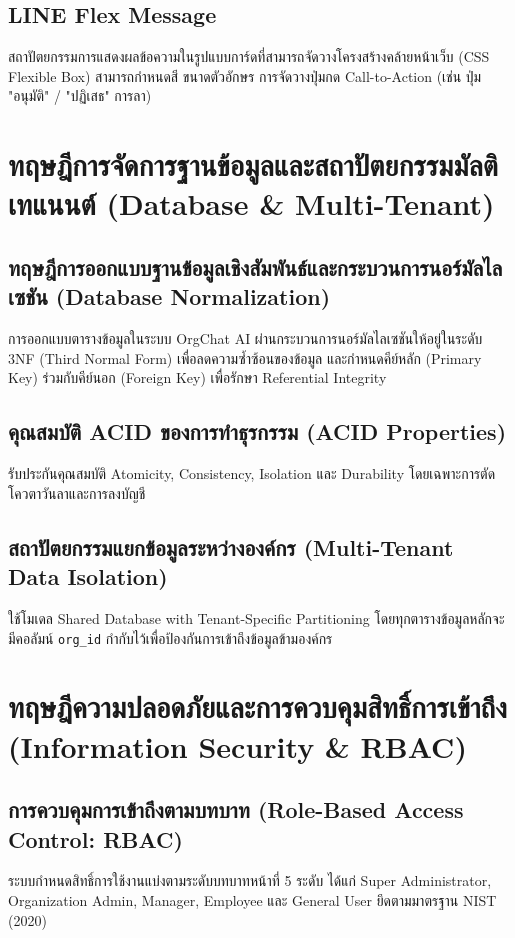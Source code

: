 \subsection{LINE Flex Message}
\hspace*{1.3em}
สถาปัตยกรรมการแสดงผลข้อความในรูปแบบการ์ดที่สามารถจัดวางโครงสร้างคล้ายหน้าเว็บ (CSS Flexible Box) สามารถกำหนดสี ขนาดตัวอักษร การจัดวางปุ่มกด Call-to-Action (เช่น ปุ่ม "อนุมัติ" / "ปฏิเสธ" การลา)

\section{ทฤษฎีการจัดการฐานข้อมูลและสถาปัตยกรรมมัลติเทแนนต์ (Database \& Multi-Tenant)}

\subsection{ทฤษฎีการออกแบบฐานข้อมูลเชิงสัมพันธ์และกระบวนการนอร์มัลไลเซชัน (Database Normalization)}
\hspace*{1.3em}
การออกแบบตารางข้อมูลในระบบ OrgChat AI ผ่านกระบวนการนอร์มัลไลเซชันให้อยู่ในระดับ 3NF (Third Normal Form) เพื่อลดความซ้ำซ้อนของข้อมูล และกำหนดคีย์หลัก (Primary Key) ร่วมกับคีย์นอก (Foreign Key) เพื่อรักษา Referential Integrity

\subsection{คุณสมบัติ ACID ของการทำธุรกรรม (ACID Properties)}
\hspace*{1.3em}
รับประกันคุณสมบัติ Atomicity, Consistency, Isolation และ Durability โดยเฉพาะการตัดโควตาวันลาและการลงบัญชี

\subsection{สถาปัตยกรรมแยกข้อมูลระหว่างองค์กร (Multi-Tenant Data Isolation)}
\hspace*{1.3em}
ใช้โมเดล Shared Database with Tenant-Specific Partitioning โดยทุกตารางข้อมูลหลักจะมีคอลัมน์ \texttt{org\_id} กำกับไว้เพื่อป้องกันการเข้าถึงข้อมูลข้ามองค์กร

\section{ทฤษฎีความปลอดภัยและการควบคุมสิทธิ์การเข้าถึง (Information Security \& RBAC)}

\subsection{การควบคุมการเข้าถึงตามบทบาท (Role-Based Access Control: RBAC)}
\hspace*{1.3em}
ระบบกำหนดสิทธิ์การใช้งานแบ่งตามระดับบทบาทหน้าที่ 5 ระดับ ได้แก่ Super Administrator, Organization Admin, Manager, Employee และ General User ยึดตามมาตรฐาน NIST (2020)

